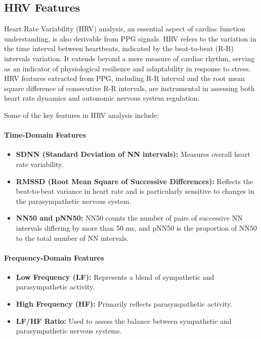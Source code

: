 \subsection*{HRV Features}
Heart Rate Variability (HRV) analysis, an essential aspect of cardiac function understanding, is also derivable from PPG signals. HRV refers to the variation in the time interval between heartbeats, indicated by the beat-to-beat (R-R) intervals variation. It extends beyond a mere measure of cardiac rhythm, serving as an indicator of physiological resilience and adaptability in response to stress. HRV features extracted from PPG, including R-R interval and the root mean square difference of consecutive R-R intervals, are instrumental in assessing both heart rate dynamics and autonomic nervous system regulation.

Some of the key features in HRV analysis include:
\paragraph*{Time-Domain Features}
\begin{itemize}
    \item \textbf{SDNN (Standard Deviation of NN intervals):} Measures overall heart rate variability.
    \item \textbf{RMSSD (Root Mean Square of Successive Differences):} Reflects the beat-to-beat variance in heart rate and is particularly sensitive to changes in the parasympathetic nervous system.
    \item \textbf{NN50 and pNN50:} NN50 counts the number of pairs of successive NN intervals differing by more than 50 ms, and pNN50 is the proportion of NN50 to the total number of NN intervals.
\end{itemize}

\paragraph*{Frequency-Domain Features}
\begin{itemize}
    \item \textbf{Low Frequency (LF):} Represents a blend of sympathetic and parasympathetic activity.
    \item \textbf{High Frequency (HF):} Primarily reflects parasympathetic activity.
    \item \textbf{LF/HF Ratio:} Used to assess the balance between sympathetic and parasympathetic nervous systems.
\end{itemize}

